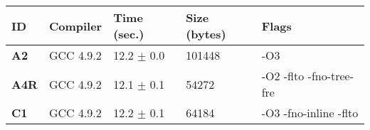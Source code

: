     \begin{tabular}{|l|l|l|l|p{3.2in}|}
     \hline
      \textbf{ID} & \textbf{Compiler} & \textbf{Time (sec.)} & \textbf{Size (bytes)} & \textbf{Flags} \\ 
     \hline
      \textbf{ A2 } &  GCC 4.9.2  &  12.2 $\pm$ 0.0  &  101448  & {\small -O3 }\\
     \hline
      \textbf{ A4R } &  GCC 4.9.2  &  12.1 $\pm$ 0.1  &  54272  & {\small -O2 -flto -fno-tree-fre }\\
     \hline
      \textbf{ C1 } &  GCC 4.9.2  &  12.2 $\pm$ 0.1  &  64184  & {\small -O3 -fno-inline -flto }\\
     \hline
    \end{tabular}    